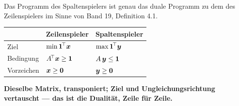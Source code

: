 \begin{merksatz}
Das Programm des Spaltenspielers ist genau das duale Programm zu dem des Zeilenspielers im Sinne von Band 19, Definition 4.1.

\begin{center}
{\small
\renewcommand{\arraystretch}{1.55}
\begin{tabular}{@{}P{2.4cm}P{2.8cm}P{2.8cm}@{}}
\toprule
& \textbf{Zeilenspieler} & \textbf{Spaltenspieler}\\
\midrule
Ziel & $\min \boldsymbol{1}^{\!\top}\boldsymbol{x}$ & $\max \boldsymbol{1}^{\!\top}\boldsymbol{y}$\\
Bedingung & $A^{\!\top}\boldsymbol{x} \ge \boldsymbol{1}$ & $A\,\boldsymbol{y} \le \boldsymbol{1}$\\
Vorzeichen & $\boldsymbol{x} \ge \boldsymbol{0}$ & $\boldsymbol{y} \ge \boldsymbol{0}$\\
\bottomrule
\end{tabular}}
\end{center}

\begin{center}
\begin{minipage}{0.9\textwidth}
\textbf{Dieselbe Matrix, transponiert; Ziel und Ungleichungsrichtung vertauscht --- das ist die Dualität, Zeile für Zeile.}
\end{minipage}
\end{center}
\end{merksatz}

